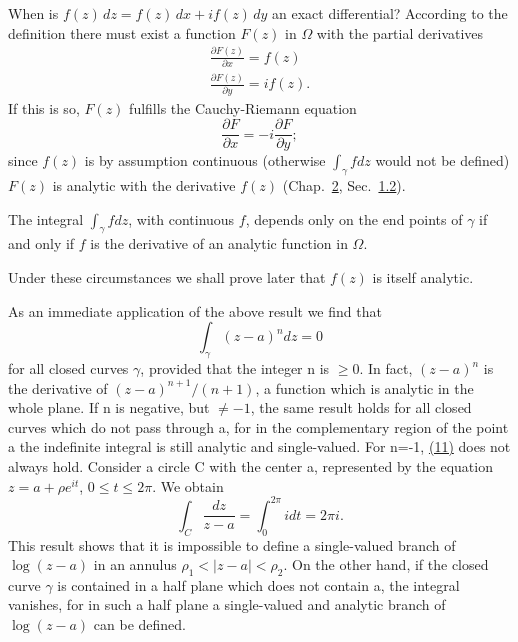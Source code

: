When is $f(z) \, dz = f(z) \, dx + if(z) \, dy$ an exact differential? According to the definition there must exist a function $F(z)$ in $\Omega$ with the partial derivatives
\begin{equation*}
\begin{array}{l} \frac {\partial F (z)}{\partial x} = f (z) \\ \frac {\partial F (z)}{\partial y} = i f (z). \end{array}
\end{equation*}
If this is so, $F(z)$ fulfills the Cauchy-Riemann equation
\begin{equation*}
\frac {\partial F}{\partial x} = - i \frac {\partial F}{\partial y};
\end{equation*}
since $f(z)$ is by assumption continuous (otherwise $\int_{\gamma} f dz$ would not be defined) $F(z)$ is analytic with the derivative $f(z)$ (Chap.~\hyperref[chap:2]{2}, Sec.~\hyperref[sec:2.1.2]{1.2}).

The integral $\int_{\gamma} f dz$, with continuous $f$, depends only on the end points of $\gamma$ if and only if $f$ is the derivative of an analytic function in $\Omega$.

Under these circumstances we shall prove later that $f(z)$ is itself analytic.

As an immediate application of the above result we find that
\begin{equation*}
\int_ {\gamma} (z - a) ^ {n} d z = 0\tag{11}\label{eq:4.11}
\end{equation*}
for all closed curves $\gamma$, provided that the integer n is $\geq0$. In fact, $(z-a)^{n}$ is the derivative of $(z-a)^{n+1}/(n+1)$, a function which is analytic in the whole plane. If n is negative, but $\neq-1$, the same result holds for all closed curves which do not pass through a, for in the complementary region of the point a the indefinite integral is still analytic and single-valued. For n=-1, \hyperref[eq:4.11]{(11)} does not always hold. Consider a circle C with the center a, represented by the equation $z=a+\rho e^{it}$, $0\leq t\leq2\pi$. We obtain
\begin{equation*}
\int_ {C} \frac {d z}{z - a} = \int_ {0} ^ {2 \pi} i d t = 2 \pi i.
\end{equation*}
This result shows that it is impossible to define a single-valued branch of $\log(z-a)$ in an annulus $\rho_{1}<|z-a|<\rho_{2}$. On the other hand, if the closed curve $\gamma$ is contained in a half plane which does not contain a, the integral vanishes, for in such a half plane a single-valued and analytic branch of $\log(z-a)$ can be defined.

